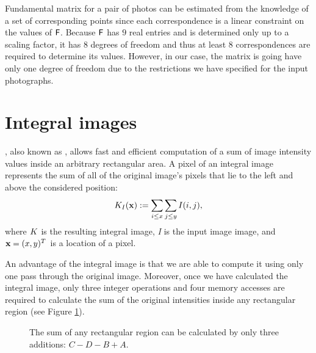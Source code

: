 Fundamental matrix for a pair of photos can be estimated from the knowledge of a set of corresponding points since each correspondence is a linear constraint on the values of $\mathsf{F}$. 
Because $\mathsf{F}$ has $9$ real entries and is determined only up to a scaling factor, it has $8$ degrees of freedom and thus at least $8$ correspondences are required to determine its values. 
However, in our case, the matrix is going have only one degree of freedom due to the restrictions we have specified for the input photographs. 

\section{Integral images}
\label{integral}

, also known as , allows fast and efficient computation of a sum of image intensity values inside an arbitrary rectangular area.
A pixel of an integral image represents the sum of all of the original image's pixels that lie to the left and above the considered position: 
\begin{equation*}
K_I(\mathbf{x}) := \sum_{i \le x} \sum_{j \le y} I(i,j),
\end{equation*}
where $K$ is the resulting integral image, \emph{I} is the input image image, and $\mathbf{x} = (x, y)^{T}$ is a location of a pixel.

An advantage of the integral image is that we are able to compute it using only one pass through the original image. 
Moreover, once we have calculated the integral image, only three integer operations and four memory accesses are required to calculate the sum 
of the original intensities inside any rectangular region (see Figure \ref{fig:integral}).

\begin{figure}[h]
  \caption{The sum of any rectangular region can be calculated by only three additions: $C - D - B + A$.}
  \label{fig:integral}
\end{figure}

